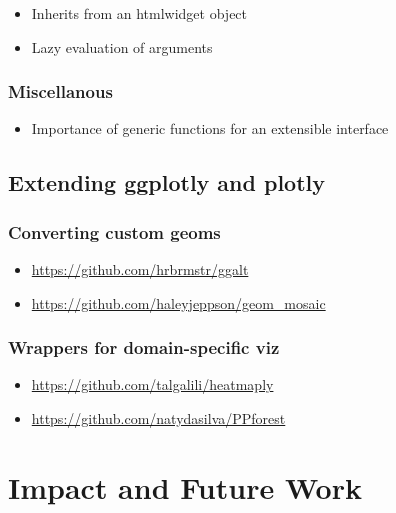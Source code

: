 \documentclass[12pt,]{isuthesis}
\providecommand{\tightlist}{%
  \setlength{\itemsep}{0pt}\setlength{\parskip}{0pt}}
\begin{document}
\begin{itemize}
\tightlist
\item
  Inherits from an htmlwidget object
\item
  Lazy evaluation of arguments
\end{itemize}

\subsection{Miscellanous}\label{miscellanous}

\begin{itemize}
\tightlist
\item
  Importance of generic functions for an extensible interface
\end{itemize}

\section{Extending ggplotly and
plotly}\label{extending-ggplotly-and-plotly}

\subsection{Converting custom geoms}\label{converting-custom-geoms}

\begin{itemize}
\tightlist
\item
  \url{https://github.com/hrbrmstr/ggalt}
\item
  \url{https://github.com/haleyjeppson/geom_mosaic}
\end{itemize}

\subsection{Wrappers for domain-specific
viz}\label{wrappers-for-domain-specific-viz}

\begin{itemize}
\tightlist
\item
  \url{https://github.com/talgalili/heatmaply}
\item
  \url{https://github.com/natydasilva/PPforest}
\end{itemize}

\chapter{Impact and Future Work}
\end{document}
